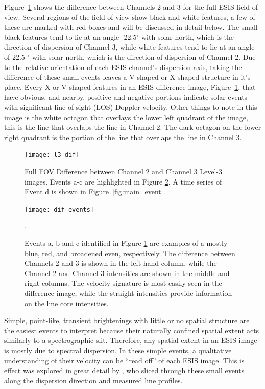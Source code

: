     	Figure~\ref{fig:l3_dif} shows the difference between Channels 2 and 3 for the full ESIS field of view.  Several regions of the field of view show black and white features, a few of these are marked with red boxes and will be discussed in detail below.  The small black features tend to lie at an angle -22.5$^\circ$ with solar north, which is the direction of dispersion of Channel 3, while white features tend to lie at an angle of 22.5 $^\circ$ with solar north, which is the direction of dispersion of Channel 2.  Due to the relative orientation of each ESIS channel's dispersion axis, taking the difference of these small events leaves a V-shaped or X-shaped structure in it's place.  Every X or V-shaped features in an ESIS difference image, Figure~\ref{fig:l3_dif}, that have obvious, and nearby, positive and negative portions indicate solar events with significant line-of-sight (LOS) Doppler velocity.   Other things to note in this image is the white octagon that overlays the lower left quadrant of the image, this is the \mgxbright line that overlaps the \ov line in Channel 2.  The dark octagon on the lower right quadrant is the portion of the \mgxbright line that overlaps the \ov line in Channel 3.    
   		
   		\begin{figure}[htb!]
   			\centering
   			\texttt{[image: l3\_dif]}
   			\caption{Full FOV Difference between Channel 2 and Channel 3 Level-3 images.  Events a-c are highlighted in Figure \ref{fig:dif_events}.  A time series of Event d is shown in Figure~\ref{fig:main_event}.}
   			\label{fig:l3_dif}
   		\end{figure}
   	
 		\begin{figure}[htb!]
   			\centering
   			\texttt{[image: dif\_events]}
   			\caption{Events a, b and c identified in Figure \ref{fig:l3_dif} are examples of a mostly blue, red, and broadened even, respectively. The difference between Channels 2 and 3 is shown in the left hand column, while the Channel 2 and Channel 3 intensities are shown in the middle and right columns.  The velocity signature is most easily seen in the difference image, while the straight intensities provide information on the line core intensities. 
   			     
   			}
   			\label{fig:dif_events}. 
   		\end{figure}

    	Simple, point-like, transient brightenings with little or no spatial structure are the easiest events to interpret because their naturally confined spatial extent acts similarly to a spectrographic slit.
    	Therefore, any spatial extent in an ESIS image is mostly due to spectral dispersion. 
    	In these simple events, a qualitative understanding of their velocity can be ``read off'' of each ESIS image.
    	This is effect was explored in great detail by \citet{Rust2019}, who sliced through these small events along the dispersion direction and measured line profiles.
    	
